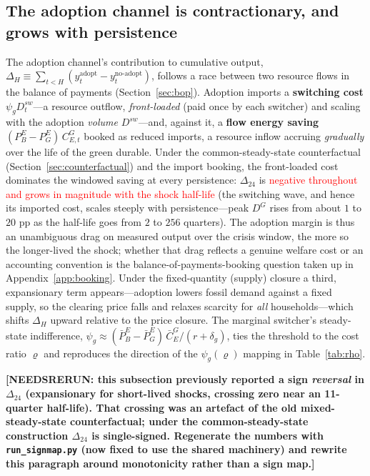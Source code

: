 \documentclass[11pt,a4paper]{article}
\newcommand{\NEEDSRERUN}[1]{\textcolor{red}{#1}}
\begin{document}
\subsection{The adoption channel is contractionary, and grows with persistence}
\label{sec:signmap}

The adoption channel's contribution to cumulative output,
$\Delta_H\equiv\sum_{t<H}(y^{\mathrm{adopt}}_t-y^{\mathrm{no\text{-}adopt}}_t)$,
follows a race between two resource flows in the balance of payments
(Section~\ref{sec:bop}). Adoption imports a \textbf{switching cost}
$\psi_g D^{sw}_t$---a resource outflow, \emph{front-loaded} (paid once by each
switcher) and scaling with the adoption \emph{volume} $D^{sw}$---and, against it,
a \textbf{flow energy saving} $(P^{E}_{B}-P^{E}_{G})\,C^{G}_{E,t}$ booked as
reduced imports, a resource inflow accruing \emph{gradually} over the life of the
green durable. Under the common-steady-state counterfactual
(Section~\ref{sec:counterfactual}) and the import booking, the front-loaded cost
dominates the windowed saving at every persistence: $\Delta_{24}$ is
\NEEDSRERUN{negative throughout and grows in magnitude with the shock half-life}
(the switching wave, and hence its imported cost, scales steeply with
persistence---peak $D^{G}$ rises from about $1$ to $20$ pp as the half-life goes
from $2$ to $256$ quarters). The adoption margin is thus an unambiguous drag on
measured output over the crisis window, the more so the longer-lived the shock;
whether that drag reflects a genuine welfare cost or an accounting convention is
the balance-of-payments-booking question taken up in
Appendix~\ref{app:booking}. Under the fixed-quantity (supply) closure a third,
expansionary term appears---adoption lowers fossil demand against a fixed supply,
so the clearing price falls and relaxes scarcity for \emph{all} households---which
shifts $\Delta_H$ upward relative to the price closure. The marginal switcher's
steady-state indifference, $\psi_g\approx(\bar P^{E}_{B}-\bar
P^{E}_{G})\,\bar C^{G}_{E}/(r+\delta_g)$, ties the threshold to the cost ratio
$\varrho$ and reproduces the direction of the $\psi_g(\varrho)$ mapping in
Table~\ref{tab:rho}.

\textbf{[NEEDSRERUN: this subsection previously reported a sign \emph{reversal}
in $\Delta_{24}$ (expansionary for short-lived shocks, crossing zero near an
11-quarter half-life). That crossing was an artefact of the old
mixed-steady-state counterfactual; under the common-steady-state construction
$\Delta_{24}$ is single-signed. Regenerate the numbers with
\texttt{run\_signmap.py} (now fixed to use the shared machinery) and rewrite this
paragraph around monotonicity rather than a sign map.]}
\end{document}
